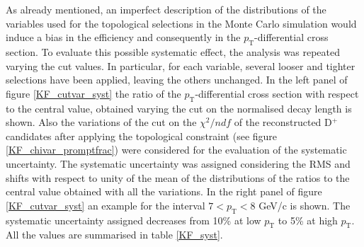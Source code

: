 \documentclass[b5paper,10pt,twoside,oldstyle,classica]{toptesi}
\newcommand{\pt}{p_\text{T}}
\begin{document}
As already mentioned, an imperfect description of the distributions of the variables used for the topological selections in the Monte Carlo simulation would induce a bias in the efficiency and consequently in the $\pt$-differential cross section. To evaluate this possible systematic effect, the analysis was repeated varying the cut values. In particular, for each variable, several looser and tighter selections have been applied, leaving the others unchanged. In the left panel of figure \ref{KF_cutvar_syst} the ratio of the $\pt$-differential cross section with respect to the central value, obtained varying the cut on the normalised decay length is shown. Also the variations of the cut on the $\chi^2/ndf$ of the reconstructed D$^+$ candidates after applying the topological constraint (see figure \ref{KF_chivar_promptfrac}) were considered for the evaluation of the systematic uncertainty. The systematic uncertainty was assigned considering the RMS and shifts with respect to unity of the mean of the distributions of the ratios to the central value obtained with all the variations. In the right panel of figure \ref{KF_cutvar_syst} an example for the interval $7<\pt<8$ GeV/c is shown. The systematic uncertainty assigned decreases from 10\% at low $\pt$ to 5\% at high $\pt$. All the values are summarised in table \ref{KF_syst}. 
\end{document}
